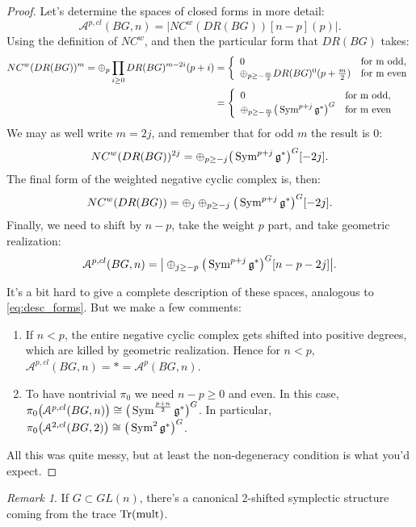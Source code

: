 \documentclass[10pt,a4paper,reqno,oneside]{book} %
\theoremstyle{plain}
\theoremstyle{definition}
\theoremstyle{remark}
\newtheorem{rem}[thm]{Remark}
\numberwithin{equation}{section}
\begin{document}
\begin{proof}
Let's determine the spaces of closed forms in more detail:
\[	\mathcal{A}^{p,cl}(BG,n) = \big| NC^w(DR(BG))[n-p](p)\big|.	\]
Using the definition of $NC^w$, and then the particular form that $DR(BG)$ takes:
\begin{align*}
	NC^w(DR(BG))^m = \oplus_p \prod_{i\geq 0} DR(BG)^{m-2i}(p+i) &= \left\{ \begin{array} {ll}
0 & \text{for m odd}, \\ \oplus_{p\geq - \frac{m}{2}} DR(BG)^0(p+\frac{m}{2}) & \text{for m even}
\end{array} \right. \\
&= \left\{ \begin{array} {ll}
0 & \text{for m odd}, \\ \oplus_{p\geq - \frac{m}{2}} \big(\operatorname{Sym}^{p+j} \mathfrak g^*\big)^G & \text{for m even}
\end{array} \right.
\end{align*}
We may as well write $m=2j$, and remember that for odd $m$ the result is 0:
\[	NC^w(DR(BG))^{2j} = \oplus_{p\geq -j} \big(\operatorname{Sym}^{p+j} \mathfrak g^*\big)^G[-2j].	\]
The final form of the weighted negative cyclic complex is, then:
\[	NC^w(DR(BG)) = \oplus_j \oplus_{p\geq -j} \big(\operatorname{Sym}^{p+j} \mathfrak g^*\big)^G[-2j].	\]
Finally, we need to shift by $n-p$, take the weight $p$ part, and take geometric realization:
\[	\mathcal{A}^{p,cl}(BG,n) = \big|  \oplus_{j\geq -p} \big(\operatorname{Sym}^{p+j} \mathfrak g^*\big)^G[n-p-2j] \big|. \]

It's a bit hard to give a complete description of these spaces, analogous to \ref{eq:desc_forms}. But we make a few comments:
\begin{enumerate}
\item If $n<p$, the entire negative cyclic complex gets shifted into positive degrees, which are killed by geometric realization.
Hence for $n<p$, $\mathcal{A}^{p,cl}(BG,n) = * = \mathcal{A}^{p}(BG,n)$.
\item To have nontrivial $\pi_0$ we need $n-p \geq 0$ and even. In this case, $\pi_0\big(\mathcal{A}^{p,cl}(BG,n)\big)
\cong \big(\operatorname{Sym}^{\frac{p+n}{2}} \mathfrak g^*\big)^G$. In particular, $\pi_0\big(\mathcal{A}^{2,cl}(BG,2)\big)
\cong \big(\operatorname{Sym}^{2} \mathfrak g^*\big)^G$.
\end{enumerate}
All this was quite messy, but at least the non-degeneracy condition is what you'd expect.
\end{proof}

\begin{rem}
\label{rem:symp_trace}
If $G \subset GL(n)$, there's a canonical 2-shifted symplectic structure coming from the trace $\operatorname{Tr}(\text{mult})$.
\end{rem}
\end{document}

